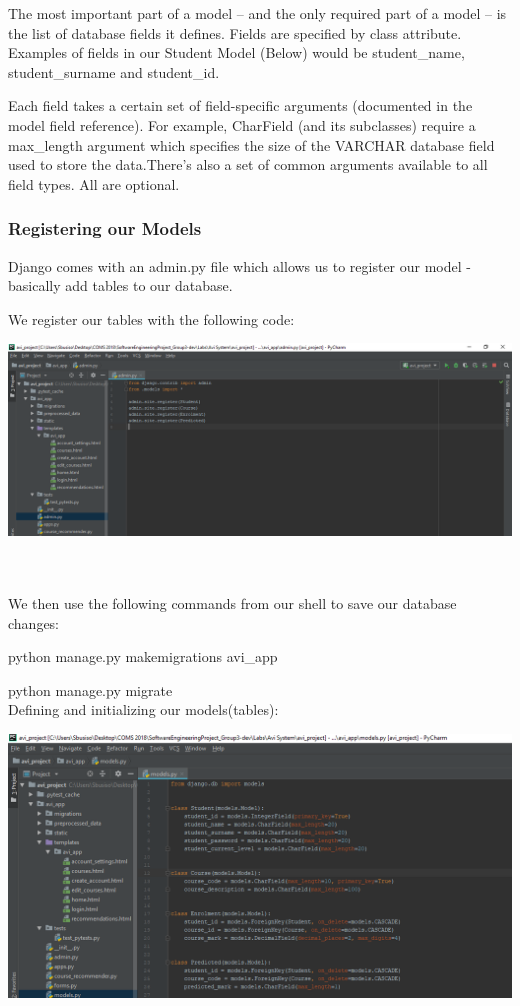 \documentclass[10pt]{article}
\begin{document}
The most important part of a model – and the only required part of a model – is the list of database fields it defines. Fields are specified by class attribute. Examples of fields in our Student Model (Below) would be student\_name, student\_surname and student\_id.

Each field takes a certain set of field-specific arguments (documented in the model field reference). For example, CharField (and its subclasses) require a max\_length argument which specifies the size of the VARCHAR database field used to store the data.There’s also a set of common arguments available to all field types. All are optional.

\subsubsection{Registering our Models}
Django comes with an admin.py file which allows us to register our model - basically add tables to our database.

We register our tables with the following code:

\begin{center}
\includegraphics[width=1.1\textwidth]{p1.png}
\end{center} \\ \\

We then use the following commands from our shell to save our database changes:

python manage.py makemigrations avi\_app

python manage.py migrate \\

Defining and initializing our models(tables):

\begin{center}
\includegraphics[width=1.1\textwidth]{p2.png}
\end{center} \\ \\
\end{document}
